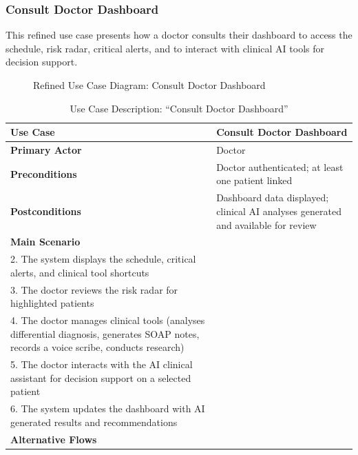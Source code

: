 \documentclass[12pt,a4paper,oneside]{report}
\begin{document}
\subsubsection{Consult Doctor Dashboard}

This refined use case presents how a doctor consults their dashboard to access the schedule, risk radar, critical alerts, and to interact with clinical AI tools for decision support.

\begin{figure}[H]
    \centering
{}
    \caption{Refined Use Case Diagram: Consult Doctor Dashboard}
    \label{fig:uc doctor dashboard}
\end{figure}

\begin{table}[H]
\centering
\caption{Use Case Description: ``Consult Doctor Dashboard''}
\label{tab:uc doctor dashboard}
\small
\begin{tabular}{|l|p{10cm}|}
\hline
\textbf{Use Case} & Consult Doctor Dashboard \\
\hline
\textbf{Primary Actor} & Doctor \\
\hline
\textbf{Preconditions} & Doctor authenticated; at least one patient linked \\
\hline
\textbf{Postconditions} & Dashboard data displayed; clinical AI analyses generated and available for review \\
\hline
\textbf{Main Scenario} &
\begin{minipage}[t]{9.5cm}
\vspace{2pt}
1. The doctor opens the dashboard\\
2. The system displays the schedule, critical alerts, and clinical tool shortcuts\\
3. The doctor reviews the risk radar for highlighted patients\\
4. The doctor manages clinical tools (analyses differential diagnosis, generates SOAP notes, records a voice scribe, conducts research)\\
5. The doctor interacts with the AI clinical assistant for decision support on a selected patient\\
6. The system updates the dashboard with AI generated results and recommendations
\vspace{2pt}
\end{minipage} \\
\hline
\textbf{Alternative Flows} &
\begin{minipage}[t]{9.5cm}

\end{minipage}
\end{tabular}
\end{table}
\end{document}
